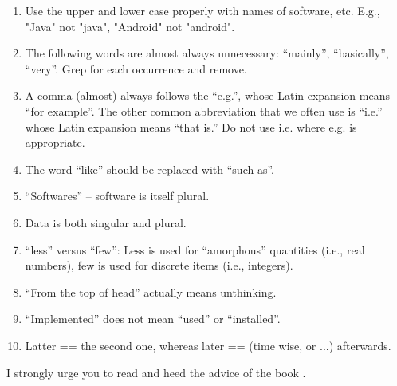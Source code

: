\begin{enumerate}

\item Use the upper and lower case properly with names of software,
  etc. E.g., "Java" not "java", "Android" not "android".

\item
  The following words are almost always unnecessary: ``mainly'',
  ``basically'', ``very''.  Grep for each occurrence and remove.

\item
  A comma (almost) always follows the ``e.g.'', whose Latin expansion
  means ``for example''.  The other common abbreviation that we often
  use is ``i.e.'' whose Latin expansion means ``that is.''  Do not use
  i.e.  where e.g. is appropriate.

\item
  The word ``like'' should be replaced with ``such as''.

\item
  ``Softwares''  -- software is itself plural.

\item
  Data is both singular and plural.

\item
  ``less'' versus ``few'': Less is used for ``amorphous'' quantities
  (i.e., real numbers), few is used for discrete items (i.e.,
  integers).

\item
  ``From the top of head'' actually means unthinking.

\item
  ``Implemented'' does not mean ``used'' or ``installed''.

\item
  Latter == the second one, whereas later == (time wise, or ...)
  afterwards.
\end{enumerate}

I strongly urge you to read and heed the advice of the book
\cite{Strunk-and-White}.


